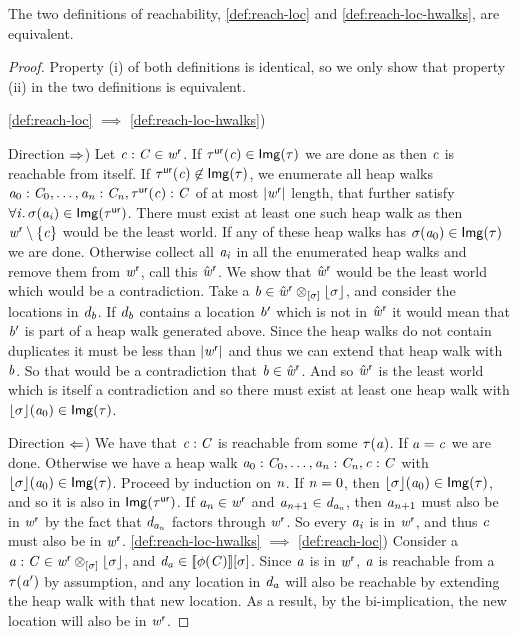 \begin{lemma}\label{lem:reach-loc-prop-equiv}
    The two definitions of reachability, \cref{def:reach-loc} and \cref{def:reach-loc-hwalks}, are equivalent.
\end{lemma}
\begin{proof}
    Property (i) of both definitions is identical, so we only show that property (ii) in the two definitions is equivalent.

    \cref{def:reach-loc} $\implies$ \cref{def:reach-loc-hwalks}) 

    Direction $\Rightarrow$) 
    Let $\mathit{c} : \mathit{C} \in \mathit{w}^{\mathsf{r}}$.
    If $\tau^{\mathsf{ur}}(\mathit{c}) \in \mathsf{Img}(\tau)$ we are done as then $\mathit{c}$ is reachable from itself. 
    If $\tau^{\mathsf{ur}}(\mathit{c}) \not\in \mathsf{Img}(\tau)$, we enumerate all heap walks $\mathit{a}_0 : \mathit{C}_0, \hdots, \mathit{a}_{\mathit{n}} : \mathit{C}_{\mathit{n}}, \tau^{\mathsf{ur}}(\mathit{c}) : \mathit{C}$ of at most $|\mathit{w}^{\mathsf{r}}|$ length, 
    that further satisfy $\forall \mathit{i}.\, \sigma(\mathit{a}_{\mathit{i}}) \in \mathsf{Img}(\tau^{\mathsf{ur}})$.
    There must exist at least one such heap walk as then $\mathit{w}^{\mathsf{r}} \setminus \{\mathit{c}\}$ would be the least world.
    If any of these heap walks has $\sigma(\mathit{a}_0) \in \mathsf{Img}(\tau)$ we are done.  
    Otherwise collect all $\mathit{a}_{\mathit{i}}$ in all the enumerated heap walks and remove them from $\mathit{w}^{\mathsf{r}}$, call this $\hat{\mathit{w}}^{\mathsf{r}}$.
    We show that $\hat{\mathit{w}}^{\mathsf{r}}$ would be the least world which would be a contradiction.
    Take a $\mathit{b} \in \hat{\mathit{w}}^{\mathsf{r}} \otimes_{[\sigma]} \lfloor\sigma\rfloor$, and consider the locations in $\mathit{d}_{\mathit{b}}$.
    If $\mathit{d}_{\mathit{b}}$ contains a location $\mathit{b}'$ which is not in $\hat{\mathit{w}}^{\mathsf{r}}$ it would mean that $\mathit{b}'$ is part of a heap walk generated above. 
    Since the heap walks do not contain duplicates it must be less than $|\mathit{w}^{\mathsf{r}}|$ and thus we can extend that heap walk with $\mathit{b}$.
    So that would be a contradiction that $\mathit{b} \in \hat{\mathit{w}}^{\mathsf{r}}$.
    And so $\hat{\mathit{w}}^{\mathsf{r}}$ is the least world which is itself a contradiction and so there must exist at least one heap walk with $\lfloor\sigma\rfloor(\mathit{a}_0) \in \mathsf{Img}(\tau)$.

    Direction $\Leftarrow$) We have that $\mathit{c} : \mathit{C}$ is reachable from some $\tau(\mathit{a})$. If $\mathit{a} = \mathit{c}$ we are done.
    Otherwise we have a heap walk $\mathit{a}_0 : \mathit{C}_0, \hdots, \mathit{a}_{\mathit{n}} : \mathit{C}_{\mathit{n}}, \mathit{c} : \mathit{C}$ with $\lfloor\sigma\rfloor(\mathit{a}_0) \in \mathsf{Img}(\tau)$.
    Proceed by induction on $\mathit{n}$. If $\mathit{n} = 0$, then $\lfloor\sigma\rfloor(\mathit{a}_0) \in \mathsf{Img}(\tau)$, and so it is also in $\mathsf{Img}(\tau^{\mathsf{ur}})$.
    If $\mathit{a}_{\mathit{n}} \in \mathit{w}^{\mathsf{r}}$ and $\mathit{a}_{\mathit{n}+1} \in \mathit{d}_{\mathit{a}_{\mathit{n}}}$, then $\mathit{a}_{\mathit{n} + 1}$ must also be in $\mathit{w}^{\mathsf{r}}$ by the  
    fact that $\mathit{d}_{\mathit{a}_{\mathit{n}}}$ factors through $\mathit{w}^{\mathsf{r}}$.
    So every $\mathit{a}_{\mathit{i}}$ is in $\mathit{w}^{\mathsf{r}}$, and thus $\mathit{c}$ must also be in $\mathit{w}^{\mathsf{r}}$.
    \nl
    \cref{def:reach-loc-hwalks} $\implies$ \cref{def:reach-loc}) 
    Consider a $\mathit{a} : \mathit{C} \in \mathit{w}^{\mathsf{r}} \otimes_{[\sigma]} \lfloor\sigma\rfloor$, and $\mathit{d}_{\mathit{a}} \in [\![\phi(\mathit{C})]\!][\sigma]$.
    Since $\mathit{a}$ is in $\mathit{w}^{\mathsf{r}}$, $\mathit{a}$ is reachable from a $\tau(\mathit{a}')$ by assumption, and any location in $\mathit{d}_{\mathit{a}}$ will also be reachable 
    by extending the heap walk with that new location.
    As a result, by the bi-implication, the new location will also be in $\mathit{w}^{\mathsf{r}}$.
\end{proof}

